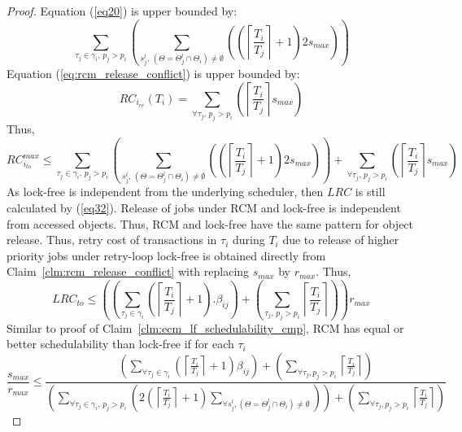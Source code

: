 \begin{proof}
Equation (\ref{eq20}) is upper bounded by:
%
\begin{equation}
\sum_{\tau_{j}\in\gamma_{i},\,p_{j}> p_{i}}\left(\sum_{s_j^l,\,\left(\Theta=\Theta_j^l \cap \Theta_i\right) \neq \emptyset}\left(\left(\left\lceil\frac{T_{i}}{T_{j}}\right\rceil+1\right)2s_{max}\right)\right)
\label{eq34}
\end{equation}
%
Equation (\ref{eq:rcm_release_conflict}) is upper bounded by:
%
\begin{equation}
RC_{i_{re}}(T_i)=\sum_{\forall \tau_j,\,p_j > p_i}\left(\left\lceil\frac{T_i}{T_j}\right\rceil s_{max}\right)
\label{eq:rcm_release_conflict_max}
\end{equation}
%
Thus, 
\begin{equation}
RC_{i_{to}}^{max} \le \sum_{\tau_{j}\in\gamma_{i},\,p_{j}> p_{i}}\left(\sum_{s_j^l,\,\left(\Theta=\Theta_j^l \cap \Theta_i\right) \neq \emptyset}\left(\left(\left\lceil\frac{T_{i}}{T_{j}}\right\rceil+1\right)2s_{max}\right)\right) + 
\sum_{\forall \tau_j,\,p_j > p_i}\left(\left\lceil\frac{T_i}{T_j}\right\rceil s_{max}\right)
\label{eq:rcm_rc_max_1}
\end{equation}
%
As lock-free is independent from the underlying scheduler, then $LRC$ is still calculated by (\ref{eq32}). Release of jobs under RCM and lock-free is independent from accessed objects. Thus, RCM and lock-free have the same pattern for object release. Thus, retry cost of transactions in $\tau_i$ during $T_i$ due to release of higher priority jobs under retry-loop lock-free is obtained directly from Claim~\ref{clm:rcm_release_conflict} with replacing $s_{max}$ by $r_{max}$. Thus,
%
\begin{equation}
LRC_{to} \le \left(\left(\sum_{\tau_{j}\in\gamma_{i}}\left(\left\lceil\frac{T_{i}}{T_{j}}\right\rceil+1\right).\beta_{ij}\right) + \left(\sum_{\tau_j,\,p_j > p_i}\left\lceil\frac{T_i}{T_j}\right\rceil \right) \right) r_{max}
\label{eq:lf_total_rc_grma}
\end{equation}
%
Similar to proof of Claim~\ref{clm:ecm_lf_schedulability_cmp}, RCM has equal or better schedulability than lock-free if for each $\tau_i$ 
%
\begin{equation}
\frac{s_{max}}{r_{max}}\le\frac{\left(\sum_{\forall\tau_{j}\in\gamma_{i}}\left(\left\lceil \frac{T_{i}}{T_{j}}\right\rceil +1\right)\beta_{ij}\right)+\left(\sum_{\forall\tau_{j},p_{j}>p_{i}}\left\lceil \frac{T_{i}}{T_{j}}\right\rceil \right)}{\left(\sum_{\forall\tau_{j}\in\gamma_{i},\,p_j>p_i}\left(2\left(\left\lceil \frac{T_{i}}{T_{j}}\right\rceil +1\right)\sum_{\forall s_{j}^{l},\left(\Theta=\Theta_{j}^{l}\cap\Theta_{i}\right)\neq\emptyset}\right)\right)+\left(\sum_{\forall\tau_{j},p_{j}>p_{i}}\left\lceil \frac{T_{i}}{T_{j}}\right\rceil \right)}

\end{equation}
\end{proof}
